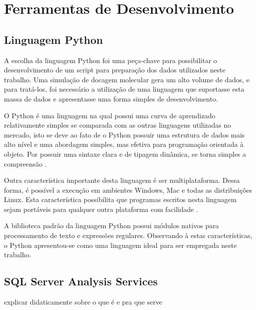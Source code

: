 \chapter{Ferramentas de Desenvolvimento}

\section{Linguagem Python}
A escolha da linguagem Python foi uma peça-chave para possibilitar o desenvolvimento de um script para preparação dos dados utilizados neste trabalho. Uma simulação de docagem molecular gera um alto volume de dados, e para tratá-los, foi necessário a utilização de uma linguagem que suportasse esta massa de dados e apresentasse uma forma simples de desenvolvimento.

O Python é uma linguagem na qual possui uma curva de aprendizado relativamente simples se comparada com as outras linguagens utilizadas no mercado, isto se deve ao fato de o Python possuir uma estrutura de dados mais alto nível e uma abordagem simples, mas efetiva para programação orientada à objeto. Por possuir uma sintaxe clara e de tipagem dinâmica, se torna simples a compreensão \cite{pyt00}. 

Outra característica importante desta linguagem é ser multiplataforma. Dessa forma, é possível a execução em ambientes Windows, Mac e todas as distribuições Linux. Esta característica possibilita que programas escritos nesta linguagem sejam portáveis para qualquer outra plataforma com facilidade \cite{pyt01}.

A biblioteca padrão da linguagem Python possui módulos nativos para processamento de texto e expressões regulares. Observando à estas características, o Python apresentou-se como uma linguagem ideal para ser empregada neste trabalho.

\section{SQL Server Analysis Services}
	explicar didaticamente sobre o que é e pra que serve
